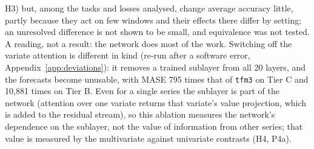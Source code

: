 H3) but, among the tasks and losses analysed, change average accuracy little, partly because they act on few windows and their
effects there differ by setting; an unresolved difference is not shown to be
small, and equivalence was not tested. A reading, not a result: the network does most of the work. Switching off the
variate attention is different in kind (re-run after a software error, Appendix~\ref{app:deviations}): it removes a trained sublayer
from all 20 layers, and the forecasts become unusable, with MASE 795 times that of \texttt{tfm3} on Tier C and 10{,}881
times on Tier B. Even for a single series the sublayer is part of the network (attention over one variate returns that
variate's value projection, which is added to the residual stream), so this ablation measures the network's dependence on the
sublayer, not the value of information from other series; that value is measured by the multivariate against univariate contrasts
(H4, P4a).

\begin{table}[!htbp]
\centering
\caption{Ablations (secondary family S5, Holm over the 16 tests of both tiers; ratios to four decimals; with Holm within each tier,
\texttt{tfm3-sym} on Tier C, unadjusted $p = 0.006$, Holm-adjusted 0.023, would also be resolved): ratio of MASE, ablated configuration / \texttt{tfm3}, on the
Tier B sample and on Tier C, on the tasks where the change can act.}
\label{tab:ablations}
\scriptsize
\setlength{\tabcolsep}{4pt}

\end{table}
